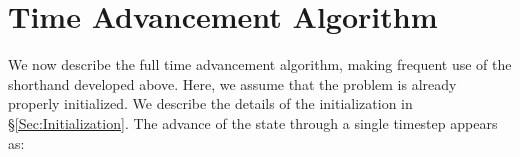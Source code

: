 
\section{Time Advancement Algorithm}\label{Sec:Time Advancement Algorithm}

We now describe the full time advancement algorithm, making frequent
use of the shorthand developed above.  Here, we assume that the
problem is already properly initialized.  We describe the details of
the initialization in \S \ref{Sec:Initialization}.
The advance of the state through a single timestep appears as:


